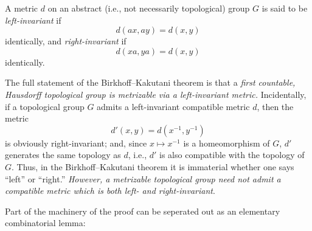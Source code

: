 \begin{definition}
    \label{def:left-right-invariant-metric}

    A metric \( d \) on an abstract (i.e., not necessarily topological) group \( G \) is said to be \emph{left-invariant} if
    \[
        d(ax, ay) = d(x, y)
    \]
    identically, and \emph{right-invariant} if
    \[
        d(xa, ya) = d(x, y)
    \]
    identically.
\end{definition}

The full statement of the Birkhoff–Kakutani theorem is that a \emph{first countable, Hausdorff topological group is metrizable via a left-invariant metric.}
Incidentally, if a topological group \( G \) admits a left-invariant compatible metric \( d \), then the metric
\[
    d'(x, y) = d(x^{-1}, y^{-1})
\]
is obviously right-invariant; and, since \( x \mapsto x^{-1} \) is a homeomorphism of \( G \), \( d' \) generates the same topology as \( d \), i.e., \( d' \) is also compatible with the topology of \( G \).
Thus, in the Birkhoff–Kakutani theorem it is immaterial whether one says “left” or “right.”
\emph{However, a metrizable topological group need not admit a compatible metric which is both left- and right-invariant}.

Part of the machinery of the proof can be seperated out as an elementary combinatorial lemma:

